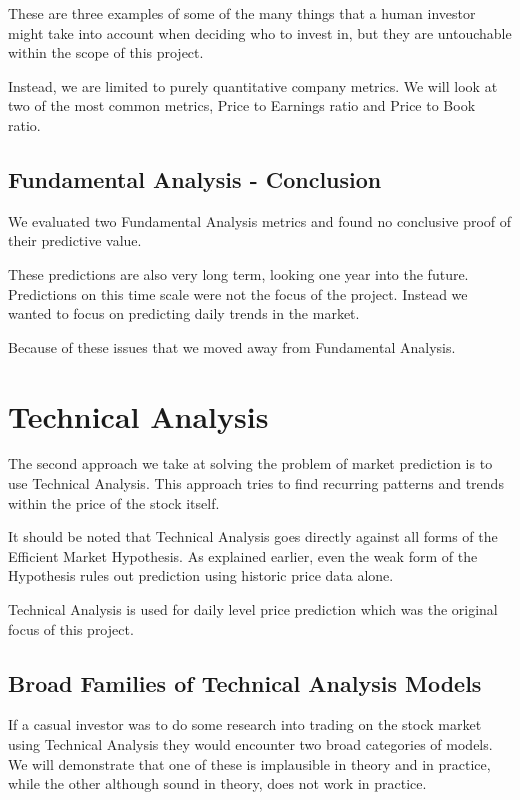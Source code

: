 \documentclass{report}
\begin{document}
These are three examples of some of the many things that a human investor might take into account when deciding who to invest in, but they are untouchable within the scope of this project. 

Instead, we are limited to purely quantitative company metrics. We will look at two of the most common metrics, Price to Earnings ratio and Price to Book ratio.

\section{Fundamental Analysis - Conclusion}

We evaluated two Fundamental Analysis metrics and found no conclusive proof of their predictive value.  

These predictions are also very long term, looking one year into the future. Predictions on this time scale were not the focus of the project. Instead we wanted to focus on predicting daily trends in the market.

Because of these issues that we moved away from Fundamental Analysis.

\chapter{Technical Analysis}


The second approach we take at solving the problem of market prediction is to use Technical Analysis. This approach tries to find recurring patterns and trends within the price of the stock itself.

It should be noted that Technical Analysis goes directly against all forms of the Efficient Market Hypothesis. As explained earlier, even the weak form of the Hypothesis rules out prediction using historic price data alone.

Technical Analysis is used for daily level price prediction which was the original focus of this project. 

\section{Broad Families of Technical Analysis Models}

If a casual investor was to do some research into trading on the stock market using Technical Analysis they would encounter two broad categories of models. We will demonstrate that one of these is implausible in theory and in practice, while the other although sound in theory, does not work in practice.
\end{document}
